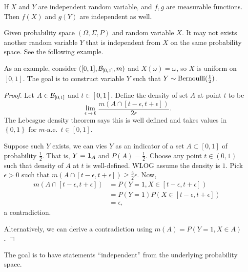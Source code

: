 \documentclass[a4paper]{article}
\begin{document}
\begin{remark}
  If $X$ and $Y$ are independent random variable, and $f, g$ are measurable functions.
  Then $f(X)$ and $g(Y)$ are independent as well.
\end{remark}

\begin{remark}
  Given probability space $(\Omega, \Sigma, P)$ and random variable $X$.
  It may not exists another random variable $Y$ that is independent from $X$
  on the same probability space.
  See the following example.
\end{remark}

\begin{eg}
  As an example, consider $([0, 1], \mathcal{B}_{[0, 1]}, m)$ and
  $X(\omega) = \omega$, so $X$ is uniform on $[0, 1]$. The goal is
  to construct variable $Y$ such that $Y \sim \operatorname{Bernoulli} (\frac{1}{2})$.

\end{eg}

\begin{proof}
  Let $A \in \mathcal{B}_{[0, 1]}$ and $t \in [0, 1]$. Define the density
  of set $A$ at point $t$ to be
  \[
  \lim_{\epsilon \to 0} \frac{m (A \cap [t - \epsilon, t + \epsilon])}
  {2 \epsilon}.
  \]
  The Lebesgue density theorem says this is well defined and
  takes values in $\left\{ 0, 1 \right\}$ for $m$-a.e.\ $t \in [0, 1]$.

  Suppose such $Y$ exists, we can vies $Y$ as an indicator of a set
  $A \subset [0, 1]$ of probability $\frac{1}{2}$. That is,
  $Y = \operatorname{\mathbf{1}}_A$ and $P (A) = \frac{1}{2}$. Choose any point $t \in (0, 1)$
  such that density of $A$ at $t$ is well-defined. WLOG assume
  the density is $1$. Pick $\epsilon > 0$ such that
  $m (A \cap [t - \epsilon, t + \epsilon]) \geq \frac{3}{2} \epsilon$.
  Now,
  \begin{align*}
    m (A \cap [t - \epsilon, t + \epsilon])
    &= P \left( Y = 1, X \in [t - \epsilon, t + \epsilon] \right) \\
    &= P \left( Y = 1 \right) P \left( X \in [t - \epsilon, t + \epsilon]
    \right) \\
    &= \epsilon,
  \end{align*}
  a contradiction.

  Alternatively, we can derive a contradiction using
  $m(A) = P \left( Y = 1, X \in A \right)$.

\end{proof}

\begin{remark}
  The goal is to have statements ``independent'' from the underlying
  probability space.
\end{remark}
\end{document}
